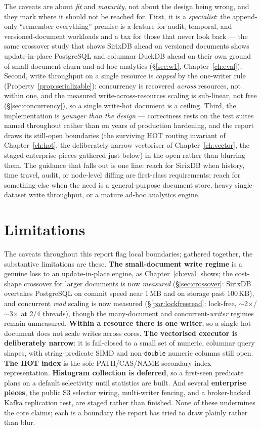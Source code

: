 \documentclass[11pt,a4paper,oneside]{report}
\theoremstyle{sirixthm}
\newcommand{\code}[1]{\texttt{#1}}
\begin{document}
The caveats are about \emph{fit} and \emph{maturity}, not about the design being wrong, and they mark where
it should not be reached for. First, it is a \emph{specialist}: the append-only ``remember everything''
premise is a feature for audit, temporal, and versioned-document workloads and a tax for those that never
look back --- the same crossover study that shows SirixDB ahead on versioned documents shows update-in-place
PostgreSQL and columnar DuckDB ahead on their own ground of small-document churn and ad-hoc analytics
(\S\ref{sec:w1}, Chapter~\ref{ch:eval}). Second, write throughput on a single resource is \emph{capped} by
the one-writer rule (Property~\ref{prop:serializable}): concurrency is recovered \emph{across} resources,
not within one, and the measured write-across-resources scaling is sub-linear, not free
(\S\ref{sec:concurrency}), so a single write-hot document is a ceiling. Third, the implementation is
\emph{younger than the design} --- correctness rests on the test suites named throughout rather than on
years of production hardening, and the report draws its still-open boundaries (the surviving HOT routing
invariant of Chapter~\ref{ch:hot}, the deliberately narrow vectoriser of Chapter~\ref{ch:vector}, the
staged enterprise pieces gathered just below) in the open rather than blurring them. The guidance that
falls out is one line: reach for SirixDB when history, time travel, audit, or node-level diffing are
first-class requirements; reach for something else when the need is a general-purpose document store, heavy
single-dataset write throughput, or a mature ad-hoc analytics engine.

\section{Limitations}
\label{sec:limitations}

The caveats throughout this report flag local boundaries; gathered together, the substantive limitations
are these. \textbf{The small-document write regime} is a genuine loss to an update-in-place engine, as
Chapter~\ref{ch:eval} shows; the cost-shape crossover for larger documents is now \emph{measured}
(\S\ref{sec:crossover}: SirixDB overtakes PostgreSQL on commit speed near 1\,MB and on storage past
100\,KB), and concurrent \emph{read} scaling is now measured (\S\ref{par:lockfreeread}: lock-free,
$\sim$2$\times$/$\sim$3$\times$ at 2/4 threads), though the many-document and
concurrent-\emph{writer} regimes remain unmeasured. \textbf{Within a resource there is one writer}, so a single hot
document does not scale writes across cores. \textbf{The vectorised executor is deliberately narrow}:
it is fail-closed to a small set of numeric, columnar query shapes, with string-predicate SIMD and
	non-\code{double} numeric columns still open. \textbf{The HOT index} is the sole PATH/CAS/NAME
	secondary-index representation. \textbf{Histogram collection is deferred}, so
a first-seen predicate plans on a default selectivity until statistics are built. And several
\textbf{enterprise pieces}, the public S3 selector wiring, multi-writer fencing, and a broker-backed
Kafka replication test, are staged rather than finished. None of these undermines the core claims; each
is a boundary the report has tried to draw plainly rather than blur.
\end{document}

